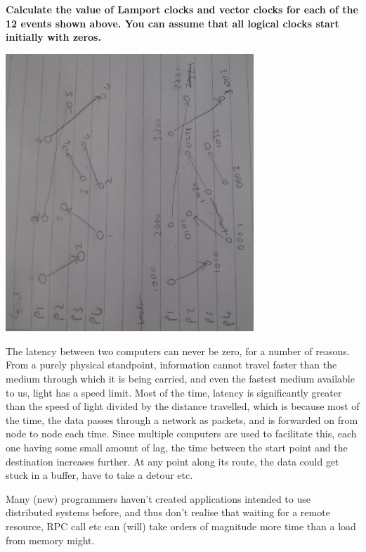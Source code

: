 \textbf{Calculate the value of Lamport clocks and vector clocks for each of the
12 events shown above. You can assume that all logical clocks start initially
with zeros.}

\begin{center}
  \includegraphics[angle=-90,width=0.7\textwidth]{images/2013-2-d-answer}
\end{center}


The latency between two computers can never be zero, for a number of reasons.
From a purely physical standpoint, information cannot travel faster than the
medium through which it is being carried, and even the fastest medium available
to us, light has a speed limit. Most of the time, latency is significantly
greater than the speed of light divided by the distance travelled, which is
because most of the time, the data passes through a network as packets, and is
forwarded on from node to node each time. Since multiple computers are used to
facilitate this, each one having some small amount of lag, the time between the
start point and the destination increases further. At any point along its route,
the data could get stuck in a buffer, have to take a detour etc.

Many (new) programmers haven't created applications intended to use distributed
systems before, and thus don't realise that waiting for a remote resource, RPC
call etc can (will) take orders of magnitude more time than a load from memory
might.

